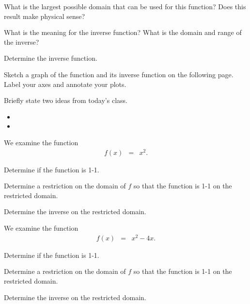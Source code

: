 \begin{problem}
  \begin{subproblem}
  \item What is the largest possible domain that can be used for this
    function? Does this result make physical sense?
    \vfill
  \item What is the meaning for the inverse function? What is the
    domain and range of the inverse?
    \vfill
  \item Determine the inverse function.
    \vfill
  \item Sketch a graph of the function and its inverse function on the
    following page. Label your axes and annotate your plots.  
  \end{subproblem}

\end{problem}

\postClass

\begin{problem}
\item Briefly state two ideas from today's class.
  \begin{itemize}
  \item 
  \item 
  \end{itemize}
\item  We examine the function
	\begin{eqnarray*}
		f(x) & = & x^2.
	\end{eqnarray*}
  \begin{subproblem}
    \item Determine if the function is 1-1.
    \item Determine a restriction on the domain of $f$ so that the function 
	    is 1-1 on the restricted domain.
    \item Determine the inverse on the restricted domain.
  \end{subproblem}
\item  We examine the function
	\begin{eqnarray*}
		f(x) & = & x^2-4x.
	\end{eqnarray*}
  \begin{subproblem}
    \item Determine if the function is 1-1.
    \item Determine a restriction on the domain of $f$ so that the function 
	    is 1-1 on the restricted domain.
    \item Determine the inverse on the restricted domain.
  \end{subproblem}
\end{problem}



